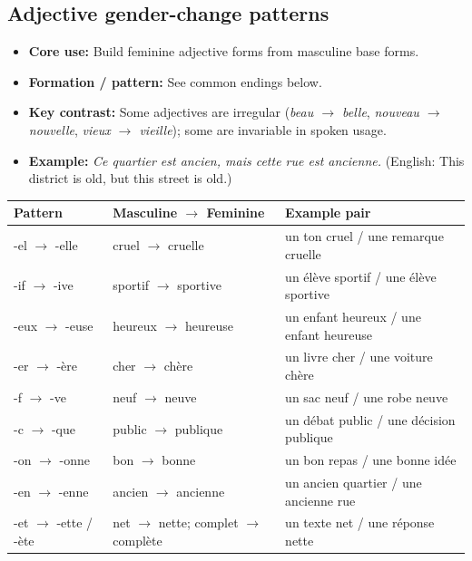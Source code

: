 \documentclass{article}
\begin{document}
\subsection{Adjective gender-change patterns}
\begin{itemize}
    \item \textbf{Core use:} Build feminine adjective forms from masculine base forms.
    \item \textbf{Formation / pattern:} See common endings below.
    \item \textbf{Key contrast:} Some adjectives are irregular (\textit{beau $\to$ belle}, \textit{nouveau $\to$ nouvelle}, \textit{vieux $\to$ vieille}); some are invariable in spoken usage.
    \item \textbf{Example:} \textit{Ce quartier est ancien, mais cette rue est ancienne.} (English: This district is old, but this street is old.)
\end{itemize}
\begin{center}
    \begin{tabular}{|l|l|l|}
        \hline
        \textbf{Pattern} & \textbf{Masculine $\to$ Feminine} & \textbf{Example pair} \\
        \hline
        -el $\to$ -elle & cruel $\to$ cruelle & un ton cruel / une remarque cruelle \\
        \hline
        -if $\to$ -ive & sportif $\to$ sportive & un élève sportif / une élève sportive \\
        \hline
        -eux $\to$ -euse & heureux $\to$ heureuse & un enfant heureux / une enfant heureuse \\
        \hline
        -er $\to$ -ère & cher $\to$ chère & un livre cher / une voiture chère \\
        \hline
        -f $\to$ -ve & neuf $\to$ neuve & un sac neuf / une robe neuve \\
        \hline
        -c $\to$ -que & public $\to$ publique & un débat public / une décision publique \\
        \hline
        -on $\to$ -onne & bon $\to$ bonne & un bon repas / une bonne idée \\
        \hline
        -en $\to$ -enne & ancien $\to$ ancienne & un ancien quartier / une ancienne rue \\
        \hline
        -et $\to$ -ette / -ète & net $\to$ nette; complet $\to$ complète & un texte net / une réponse nette \\
        \hline
    \end{tabular}
\end{center}
\end{document}
